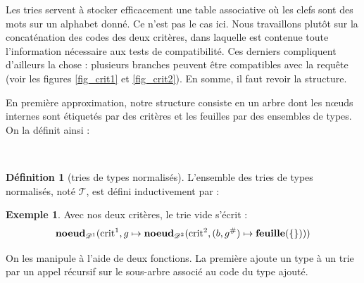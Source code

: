 \documentclass[a4paper]{report}
\theoremstyle{definition}
\newtheorem{definition}[theoreme]{Définition}
\newtheorem{exemple}[theoreme]{Exemple}
\newcommand{\N}{\mathrm{N}}
\newcommand\gab[1]{{\bf\color{Orange}{TODO: #1}}\\}
\begin{document}
{Les tries servent à stocker efficacement une table associative où les clefs sont des mots sur un alphabet donné. Ce n'est pas le cas ici. Nous travaillons plutôt sur la concaténation des codes des deux critères, dans laquelle est contenue toute l'information nécessaire aux tests de compatibilité. Ces derniers compliquent d'ailleurs la chose : plusieurs branches peuvent être compatibles avec la requête (voir les figures \ref{fig_crit1} et \ref{fig_crit2}). En somme, il faut revoir la structure.

En première approximation, notre structure consiste en un arbre dont les nœuds internes sont étiquetés par des critères et les feuilles par des ensembles de types. On la définit ainsi :

\gab{Je pense que les définitions matheuses sont ici inutiles. Le code OCaml (ou un pseudo code équivalent) est plus clair.}

\begin{definition}[tries de types normalisés]
  L'ensemble des tries de types normalisés, noté $\mathscr{T}$, est défini inductivement par :
\end{definition}

\begin{exemple}
  Avec nos deux critères, le trie vide s'écrit : \\
  \[ \bold{noeud}_{\mathscr{D}^1} (\mathrm{crit}^1, g \mapsto \bold{noeud}_{\mathscr{D}^2} (\mathrm{crit}^2, (b, g^\#) \mapsto \bold{feuille} (\{ \}))) \]
\end{exemple}

On les manipule à l'aide de deux fonctions. La première ajoute un type à un trie par un appel récursif sur le sous-arbre associé au code du type ajouté.

}
\end{document}
